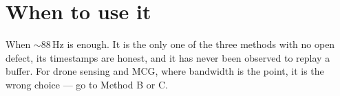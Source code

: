 \section{When to use it}

When $\sim$88\,Hz is enough. It is the only one of the three methods with no open
defect, its timestamps are honest, and it has never been observed to replay a
buffer. For drone sensing and MCG, where bandwidth is the point, it is the wrong
choice --- go to Method B or C.
